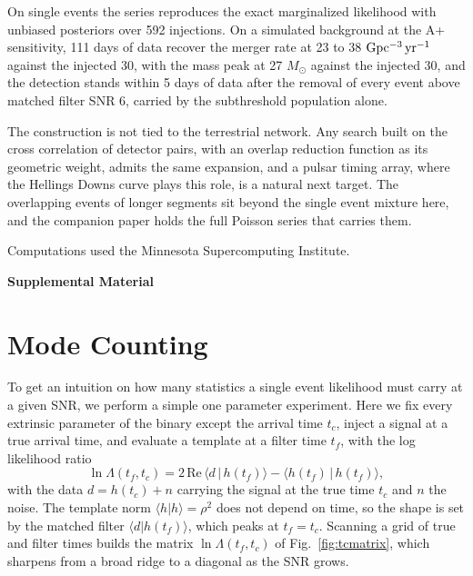 \documentclass[aps,prd,twocolumn,superscriptaddress,nofootinbib]{revtex4-2}
\begin{document}
On single events the series reproduces the exact marginalized
likelihood with unbiased posteriors over 592 injections. On a
simulated background at the A+ sensitivity, 111 days of data
recover the merger rate at 23 to 38 ${\rm Gpc^{-3}\,yr^{-1}}$
against the injected 30, with the mass peak at 27 $M_\odot$
against the injected 30, and the detection stands within 5 days
of data after the removal of every event above matched filter
SNR 6, carried by the subthreshold population alone.

The construction is not tied to the terrestrial network. Any
search built on the cross correlation of detector pairs, with an
overlap reduction function as its geometric weight, admits the
same expansion, and a pulsar timing array, where the Hellings
Downs curve plays this role, is a natural next target. The
overlapping events of longer segments sit beyond the single event
mixture here, and the companion paper holds the full Poisson
series that carries them.

\begin{acknowledgments}
Computations used the Minnesota Supercomputing Institute.
\end{acknowledgments}



\clearpage
\onecolumngrid
\begin{center}
{\large\bf Supplemental Material}
\end{center}
\appendix

\section{Mode Counting}
\label{app:modes}

To get an intuition on how many statistics a single event likelihood
must carry at a given SNR, we perform a simple one
parameter experiment. Here we fix every extrinsic parameter of the
binary except the arrival time $t_c$, inject a signal at a true
arrival time, and evaluate a template at a filter time $t_f$, with
the log likelihood ratio
\begin{equation}
\ln \Lambda(t_f, t_c) = 2\,\mathrm{Re}\,\langle d \,|\, h(t_f) \rangle
- \langle h(t_f) \,|\, h(t_f) \rangle,
\label{eq:tcllr}
\end{equation}
with the data $d = h(t_c) + n$ carrying the signal at the true time
$t_c$ and $n$ the noise. The template norm
$\langle h | h \rangle = \rho^2$ does not depend on time, so the shape
is set by the matched filter $\langle d | h(t_f) \rangle$, which peaks
at $t_f = t_c$. Scanning a grid of true and filter times builds the
matrix $\ln \Lambda(t_f, t_c)$ of Fig.~\ref{fig:tcmatrix}, which
sharpens from a broad ridge to a diagonal as the SNR
grows.
\end{document}
